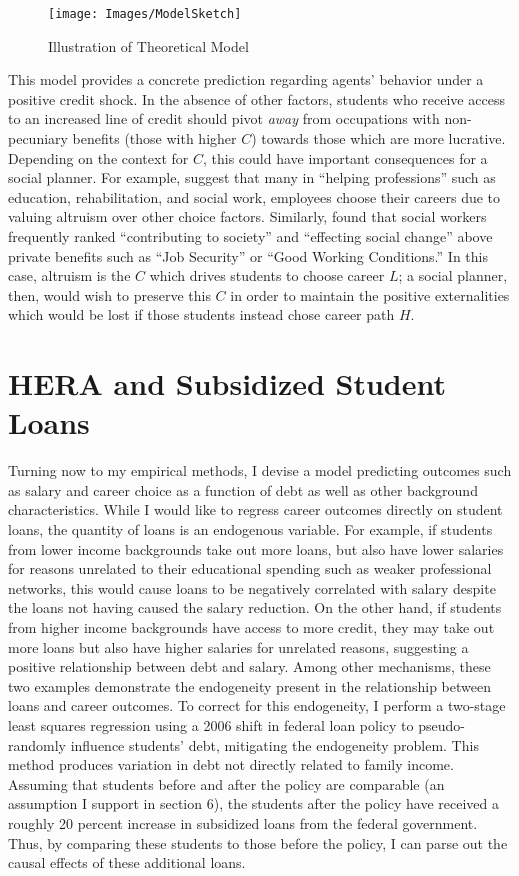 \documentclass[12pt]{article}
\begin{document}
		
	\begin{figure}
		\centering
		\caption{Illustration of Theoretical Model}
		\label{struc}
		\texttt{[image: Images/ModelSketch]}
	\end{figure}

	This model provides a concrete prediction regarding agents' behavior under a positive credit shock. In the absence of other factors, students who receive access to an increased line of credit should pivot \emph{away} from occupations with non-pecuniary benefits (those with higher $C$) towards those which are more lucrative. Depending on the context for $C$, this could have important consequences for a social planner. For example, \textcite{benshem1991} suggest that many in ``helping professions'' such as education, rehabilitation, and social work, employees choose their careers due to valuing altruism over other choice factors. Similarly, \textcite{hanson1995} found that social workers frequently ranked ``contributing to society'' and ``effecting social change'' above private benefits such as ``Job Security'' or ``Good Working Conditions.'' In this case, altruism is the $C$ which drives students to choose career $L$; a social planner, then, would wish to preserve this $C$ in order to maintain the positive externalities which would be lost if those students instead chose career path $H$.

	\section{HERA and Subsidized Student Loans}
	
	Turning now to my empirical methods, I devise a model predicting outcomes such as salary and career choice as a function of debt as well as other background characteristics. While I would like to regress career outcomes directly on student loans, the quantity of loans is an endogenous variable. For example, if students from lower income backgrounds take out more loans, but also have lower salaries for reasons unrelated to their educational spending such as weaker professional networks, this would cause loans to be negatively correlated with salary despite the loans not having caused the salary reduction. On the other hand, if students from higher income backgrounds have access to more credit, they may take out more loans but also have higher salaries for unrelated reasons, suggesting a positive relationship between debt and salary. Among other mechanisms, these two examples demonstrate the endogeneity present in the relationship between loans and career outcomes. To correct for this endogeneity, I perform a two-stage least squares regression using a 2006 shift in federal loan policy to pseudo-randomly influence students' debt, mitigating the endogeneity problem. This method produces variation in debt not directly related to family income. Assuming that students before and after the policy are comparable (an assumption I support in section 6), the students after the policy have received a roughly 20 percent increase in subsidized loans from the federal government. Thus, by comparing these students to those before the policy, I can parse out the causal effects of these additional loans.
	
\end{document}
